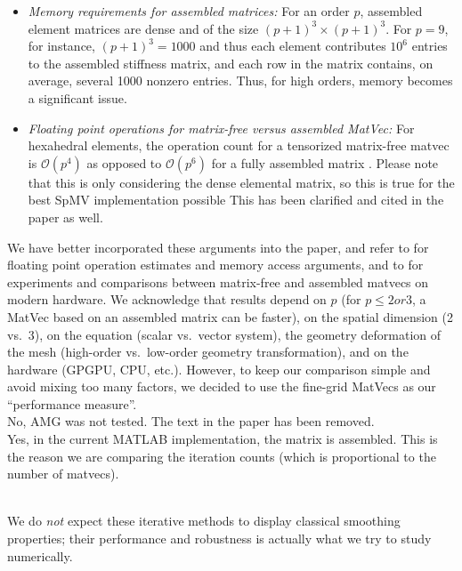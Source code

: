 \documentclass[12pt]{article}
\newcommand{\todo}[1]{\noindent\emph{\textcolor{red}{Todo: #1\:}}}
\newcommand{\note}[1]{\noindent\emph{\textcolor{green}{Note: #1\:}}}
\newcommand{\referee}[1]{\vspace{3ex}\noindent{\textcolor{blue}{#1}}\\[2ex]}
\begin{document}
\begin{itemize}
\item \emph{Memory requirements for assembled matrices:} For an order
  $p$, assembled element matrices are dense and of the size
  $(p+1)^3\times(p+1)^3$. For $p=9$, for instance, $(p+1)^3=1000$ and
  thus each element contributes $10^6$ entries to the assembled
  stiffness matrix, and each row in the matrix contains, on average,
  several 1000 nonzero entries. Thus, for high orders, memory becomes
  a significant issue.
\item \emph{Floating point operations for matrix-free versus assembled
  MatVec:} For hexahedral elements, the operation count for a
  tensorized matrix-free matvec is $\mathcal{O}(p^4)$ as opposed to
  $\mathcal{O}(p^6)$ for a fully assembled matrix \cite{orszag80}.
   Please note that this is only considering the dense elemental
  matrix, so this is true for the best SpMV implementation possible
    This has been clarified and cited in the paper as
  well.
\end{itemize}
We have better incorporated these arguments into the paper, and refer
to \cite{orszag80,DevilleFischerMund02,ptatin3d} for floating point operation estimates
and memory access arguments, and to \cite{ptatin3d,BursteddeGhattasGurnisEtAl08} for
experiments and comparisons between matrix-free and assembled matvecs
on modern hardware. We acknowledge that results depend on $p$ (for
$p\le 2 or 3$, a MatVec based on an assembled matrix can be faster),
on the spatial dimension (2 vs.\ 3), on the equation (scalar
vs.\ vector system), the geometry deformation of the mesh (high-order
vs.\ low-order geometry transformation), and on the hardware (GPGPU,
CPU, etc.). However, to keep our comparison simple and avoid mixing
too many factors, we decided to use the fine-grid MatVecs as our
``performance measure''.\\[1ex]


\noindent
No, AMG was not tested. The text in the paper has been removed.\\[1ex]

\noindent
Yes, in the current MATLAB implementation, the matrix is
assembled. This is the reason we are comparing the iteration counts
(which is proportional to the number of matvecs).

\referee{ Figure 2 needs some work.  Column 1 displays the smoothing
  properties.  But why should we expect Jacobi, Chebyshev, and SSOR to
  display classic smoothing properties for high-order problems?  And
  why does weighted Jacobi annihilate all high-order modes (for
  linears) in the top corner plot?  In addition, the use of a single
  coarse grid is used here (so it should be labeled two-grid rather
  than V-cycle, but this is minor), but what is the coarse grid?  For
  presentation, a suggestion is to move the rather lengthy paragraph
  in the Figure 2 caption to the section where it is cited.
}
\noindent
We do \emph{not} expect these iterative methods to display classical
smoothing properties; their performance and robustness is actually
what we try to study numerically. 
\end{document}
